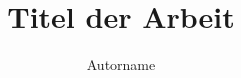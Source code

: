 \documentclass[fallstudie,grey,english]{mas-thesis}				%
\author{Autorname}
\title{Titel der Arbeit}
\begin{document}
\maketitle
\makelicensepageCCBYSA


% 
% 
% 
% 
% 
% 







% 







% 
\end{document}
